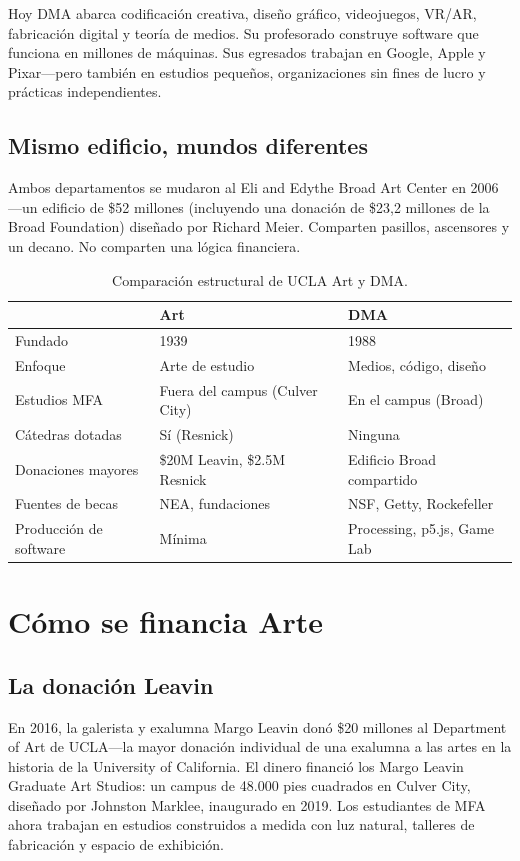 \documentclass[10pt,letterpaper,twocolumn]{article}
\newcommand{\dma}{\textsc{DMA}}
\begin{document}
Hoy \dma{} abarca codificación creativa, diseño gráfico, videojuegos, VR/AR, fabricación digital y teoría de medios. Su profesorado construye software que funciona en millones de máquinas. Sus egresados trabajan en Google, Apple y Pixar---pero también en estudios pequeños, organizaciones sin fines de lucro y prácticas independientes.

\subsection{Mismo edificio, mundos diferentes}

Ambos departamentos se mudaron al Eli and Edythe Broad Art Center en 2006---un edificio de \$52 millones (incluyendo una donación de \$23,2 millones de la Broad Foundation) diseñado por Richard Meier. Comparten pasillos, ascensores y un decano. No comparten una lógica financiera.

\begin{table}[h]
\small
\centering
\begin{tabularx}{\columnwidth}{lXX}
\toprule
& \textbf{Art} & \textbf{DMA} \\
\midrule
Fundado & 1939 & 1988 \\
Enfoque & Arte de estudio & Medios, código, diseño \\
Estudios MFA & Fuera del campus (Culver City) & En el campus (Broad) \\
Cátedras dotadas & Sí (Resnick) & Ninguna \\
Donaciones mayores & \$20M Leavin, \$2.5M Resnick & Edificio Broad compartido \\
Fuentes de becas & NEA, fundaciones & NSF, Getty, Rockefeller \\
Producción de software & Mínima & Processing, p5.js, Game Lab \\
\bottomrule
\end{tabularx}
\caption{Comparación estructural de UCLA Art y \dma{}.}
\label{tab:comparison}
\end{table}

\section{Cómo se financia Arte}

\subsection{La donación Leavin}

En 2016, la galerista y exalumna Margo Leavin donó \$20 millones al Department of Art de UCLA---la mayor donación individual de una exalumna a las artes en la historia de la University of California. El dinero financió los Margo Leavin Graduate Art Studios: un campus de 48.000 pies cuadrados en Culver City, diseñado por Johnston Marklee, inaugurado en 2019. Los estudiantes de MFA ahora trabajan en estudios construidos a medida con luz natural, talleres de fabricación y espacio de exhibición.
\end{document}
